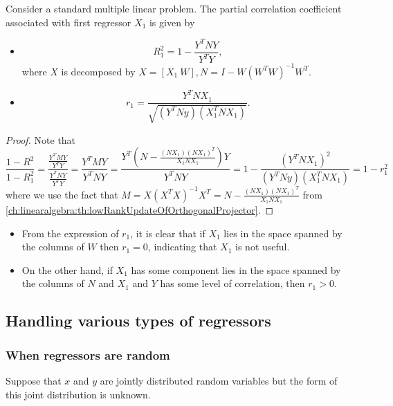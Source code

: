\begin{refsection}
\begin{lemma}\cite[173]{theil1971principles}
Consider a standard multiple linear problem. The partial correlation coefficient associated with first regressor $X_1$ is given by
\begin{itemize}
	\item 
	$$R_1^2 = 1 - \frac{Y^TNY}{Y^TY},$$
	where  $X$ is decomposed by $X = [X_1 ~ W], N = I - W(W^TW)^{-1}W^T.$
	\item $$r_1 = \frac{Y^TNX_1}{\sqrt{(Y^TNy)(X_1^TNX_1)}}.$$
\end{itemize}	
\end{lemma}
\begin{proof}
Note that 
$$\frac{1-R^2}{1-R_1^2} = \frac{\frac{Y^TMY}{Y^TY}}{\frac{Y^TNY}{Y^TY}} = \frac{Y^TMY}{Y^TNY} = \frac{Y^T(N - \frac{(NX_1)(NX_1)^T}{X_1NX_1})Y}{Y^TNY} = 1 -\frac{(Y^TNX_1)^2}{(Y^TNy)(X_1^TNX_1)} = 1-r_1^2 $$	
where we use the fact that
$M = X(X^TX)^{-1}X^T = N - \frac{(NX_1)(NX_1)^T}{X_1NX_1}$ from \autoref{ch:linearalgebra:th:lowRankUpdateOfOrthogonalProjector}.
\end{proof}

\begin{remark}[interpretation]\hfill
\begin{itemize}
	\item From the expression of $r_1$, it is clear that if $X_1$ lies in the space spanned by the columns of $W$ then $r_1 = 0$, indicating that $X_1$ is not useful.	
	\item On the other hand, if $X_1$ has some component lies in the space spanned by the columns of $N$ and $X_1$ and $Y$ has some level of correlation, then $r_1 > 0$.
\end{itemize}

\end{remark}


\subsection{Handling various types of regressors}

\subsubsection{When regressors are random}


\begin{note}\cite[49]{montgomery2012introduction}
Suppose that $x$ and $y$ are jointly distributed random variables but the form of this joint distribution is unknown.


\end{note}
\end{refsection}
